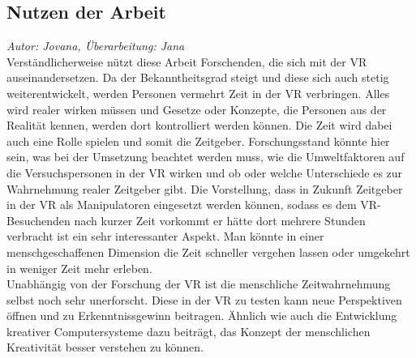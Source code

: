 \documentclass{Bericht}
\begin{document}
\subsection{Nutzen der Arbeit}
\textit{Autor: Jovana, Überarbeitung: Jana}\\
Verständlicherweise nützt diese Arbeit Forschenden, die sich mit der VR auseinandersetzen.
Da der Bekanntheitsgrad steigt und diese sich auch stetig weiterentwickelt, werden Personen vermehrt Zeit in der VR verbringen. Alles wird realer wirken müssen und Gesetze oder Konzepte, die Personen aus der Realität kennen, werden dort kontrolliert werden können. Die Zeit wird dabei auch eine Rolle spielen und somit die Zeitgeber. 
Forschungsstand könnte hier sein, was bei der Umsetzung beachtet werden muss, wie die Umweltfaktoren auf die Versuchspersonen in der VR wirken und ob oder welche Unterschiede es zur Wahrnehmung realer Zeitgeber gibt. Die Vorstellung, dass in Zukunft Zeitgeber in der VR als Manipulatoren eingesetzt werden können, sodass es dem VR-Besuchenden nach kurzer Zeit vorkommt er hätte dort mehrere Stunden verbracht ist ein sehr interessanter Aspekt. Man könnte in einer menschgeschaffenen Dimension die Zeit schneller vergehen lassen oder umgekehrt in weniger Zeit mehr erleben.\\
Unabhängig von der Forschung der VR ist die menschliche Zeitwahrnehmung selbst noch sehr unerforscht. Diese in der VR zu testen kann neue Perspektiven öffnen und zu Erkenntnissgewinn beitragen. Ähnlich wie auch die Entwicklung kreativer Computersysteme dazu beiträgt,  das Konzept der menschlichen Kreativität besser verstehen zu können\cite{comp}.
\end{document}
